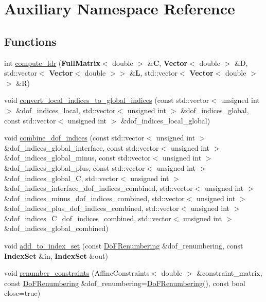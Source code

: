 \hypertarget{namespace_auxiliary}{}\section{Auxiliary Namespace Reference}
\label{namespace_auxiliary}
\subsection*{Functions}
\begin{DoxyCompactItemize}
\item 
int \hyperlink{namespace_auxiliary_abe796c1529d11eed08fd05bca82f3002}{compute\+\_\+ldr} ({\bf Full\+Matrix}$<$ double $>$ \&{\bf C}, {\bf Vector}$<$ double $>$ \&D, std\+::vector$<$ {\bf Vector}$<$ double $>$$>$ \&{\bf L}, std\+::vector$<$ {\bf Vector}$<$ double $>$$>$ \&R)
\item 
void \hyperlink{namespace_auxiliary_ad3c42d209f0ba8e9d4ce305060634bf1}{convert\+\_\+local\+\_\+indices\+\_\+to\+\_\+global\+\_\+indices} (const std\+::vector$<$ unsigned int $>$ \&dof\+\_\+indices\+\_\+local, std\+::vector$<$ unsigned int $>$ \&dof\+\_\+indices\+\_\+global, const std\+::vector$<$ unsigned int $>$ \&dof\+\_\+indices\+\_\+local\+\_\+global)
\item 
void \hyperlink{namespace_auxiliary_a1d90ebc8738df3d8c70b540034137019}{combine\+\_\+dof\+\_\+indices} (const std\+::vector$<$ unsigned int $>$ \&dof\+\_\+indices\+\_\+global\+\_\+interface, const std\+::vector$<$ unsigned int $>$ \&dof\+\_\+indices\+\_\+global\+\_\+minus, const std\+::vector$<$ unsigned int $>$ \&dof\+\_\+indices\+\_\+global\+\_\+plus, const std\+::vector$<$ unsigned int $>$ \&dof\+\_\+indices\+\_\+global\+\_\+C, std\+::vector$<$ unsigned int $>$ \&dof\+\_\+indices\+\_\+interface\+\_\+dof\+\_\+indices\+\_\+combined, std\+::vector$<$ unsigned int $>$ \&dof\+\_\+indices\+\_\+minus\+\_\+dof\+\_\+indices\+\_\+combined, std\+::vector$<$ unsigned int $>$ \&dof\+\_\+indices\+\_\+plus\+\_\+dof\+\_\+indices\+\_\+combined, std\+::vector$<$ unsigned int $>$ \&dof\+\_\+indices\+\_\+\+C\+\_\+dof\+\_\+indices\+\_\+combined, std\+::vector$<$ unsigned int $>$ \&dof\+\_\+indices\+\_\+global\+\_\+combined)
\item 
void \hyperlink{namespace_auxiliary_aca5fe5966aef4ba2293fb44095bfd86c}{add\+\_\+to\+\_\+index\+\_\+set} (const \hyperlink{class_do_f_renumbering}{Do\+F\+Renumbering} \&dof\+\_\+renumbering, const {\bf Index\+Set} \&in, {\bf Index\+Set} \&out)
\item 
void \hyperlink{namespace_auxiliary_aa6148bcbaf5e3003717b4dd2a4da15b3}{renumber\+\_\+constraints} (Affine\+Constraints$<$ double $>$ \&constraint\+\_\+matrix, const \hyperlink{class_do_f_renumbering}{Do\+F\+Renumbering} \&dof\+\_\+renumbering=\hyperlink{class_do_f_renumbering}{Do\+F\+Renumbering}(), const bool close=true)

\end{DoxyCompactItemize}
